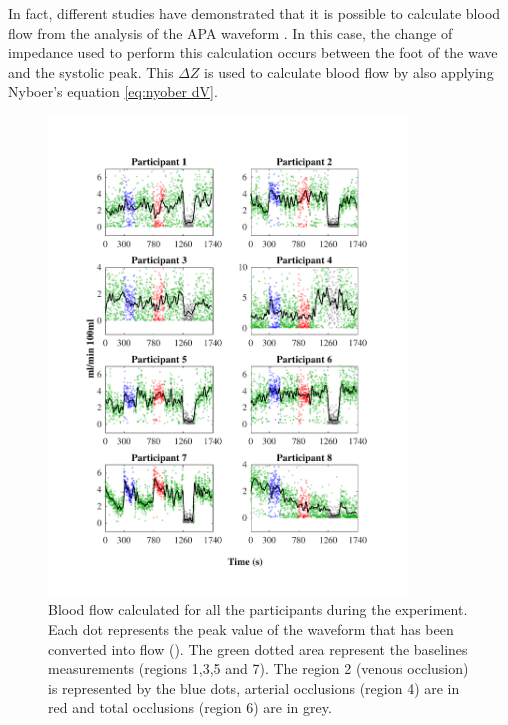 In fact, different studies have demonstrated that it is possible to calculate blood flow from the analysis of the APA waveform \cite{corciova2011peripheral, costeloe1980continuous, brown1975impedance}. In this case, the change of impedance used to perform this calculation occurs between the foot of the wave and the systolic peak. This $\Delta Z$ is used to calculate blood flow by also applying Nyboer's equation \ref{eq:nyober dV}.

\begin{figure}[!htbp]
	\centering
	\includegraphics[width=0.85\textwidth,trim={1.5cm 0.5cm 1.5cm 1.5cm},clip]{figure_apa_8}
	\caption[Blood flow calculated from impedance plethysmography waveform at the time of the whole expetiment]{Blood flow calculated for all the participants during the experiment. Each dot represents the peak value of the waveform that has been converted into flow (\si{\bfv}). The green dotted area represent the baselines measurements (regions 1,3,5 and 7). The region 2 (venous occlusion) is represented by the blue dots, arterial occlusions (region 4) are in red and total occlusions (region 6) are in grey.}
	\label{fig:blood_flow_plethysmography}
\end{figure}

